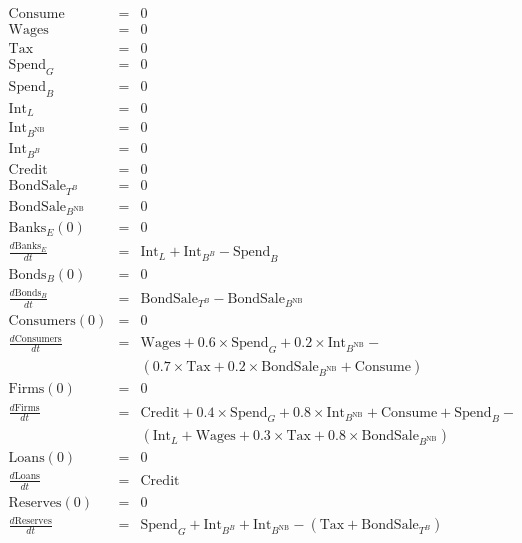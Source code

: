 \documentclass{book}
\def\lthtmlcheckvsize{\ifdim\ht\sizebox<\vsize 
  \ifdim\wd\sizebox<\hsize\expandafter\hfill\fi \expandafter\vfill
  \else\expandafter\vss\fi}%
\begin{document}
{\newpage\clearpage
{}%
\begin{eqnarray*}
\mathrm{Consume}&=&0\\
\mathrm{Wages}&=&0\\
\mathrm{Tax}&=&0\\
\mathrm{Spend}_{G}&=&0\\
\mathrm{Spend}_{B}&=&0\\
\mathrm{Int}_{L}&=&0\\
\mathrm{Int}_{B^{\mathrm{{NB}}}}&=&0\\
\mathrm{Int}_{B^{B}}&=&0\\
\mathrm{Credit}&=&0\\
\mathrm{BondSale}_{T^{B}}&=&0\\
\mathrm{BondSale}_{B^{\mathrm{{NB}}}}&=&0\\
\mathrm{Banks}_{E}(0)&=&0\\
\frac{ d \mathrm{Banks}_{E}}{dt} &=&\mathrm{Int}_{L}+\mathrm{Int}_{B^{B}}-\mathrm{Spend}_{B}\\
\mathrm{Bonds}_{B}(0)&=&0\\
\frac{ d \mathrm{Bonds}_{B}}{dt} &=&\mathrm{BondSale}_{T^{B}}-\mathrm{BondSale}_{B^{\mathrm{{NB}}}}\\
\mathrm{Consumers}(0)&=&0\\
\frac{ d \mathrm{Consumers}}{dt} &=&\mathrm{Wages}+0.6\times
                                     \mathrm{Spend}_{G}+0.2\times
                                     \mathrm{Int}_{B^{\mathrm{{NB}}}}-\\
  &&\left(0.7\times \mathrm{Tax}+0.2\times \mathrm{BondSale}_{B^{\mathrm{{NB}}}}+\mathrm{Consume}\right)\\
\mathrm{Firms}(0)&=&0\\
\frac{ d \mathrm{Firms}}{dt} &=&\mathrm{Credit}+0.4\times
                                 \mathrm{Spend}_{G}+0.8\times
                                 \mathrm{Int}_{B^{\mathrm{{NB}}}}+\mathrm{Consume}+\mathrm{Spend}_{B}-\\
  &&\left(\mathrm{Int}_{L}+\mathrm{Wages}+0.3\times \mathrm{Tax}+0.8\times \mathrm{BondSale}_{B^{\mathrm{{NB}}}}\right)\\
\mathrm{Loans}(0)&=&0\\
\frac{ d \mathrm{Loans}}{dt} &=&\mathrm{Credit}\\
\mathrm{Reserves}(0)&=&0\\
\frac{ d \mathrm{Reserves}}{dt} &=&\mathrm{Spend}_{G}+\mathrm{Int}_{B^{B}}+\mathrm{Int}_{B^{\mathrm{{NB}}}}-\left(\mathrm{Tax}+\mathrm{BondSale}_{T^{B}}\right)\\
\end{eqnarray*}%
\lthtmldisplayZ
\lthtmlcheckvsize\clearpage}
\end{document}
